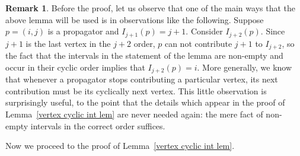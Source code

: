 \documentclass[11pt]{article}
\theoremstyle{remark}
\theoremstyle{definition}
\newtheorem{rmk}[thm]{Remark}
\begin{document}
\begin{rmk}\label{rmk cyclic}
  Before the proof, let us observe that one of the main ways that the above lemma will be used is in observations like the following.  Suppose $p=(i,j)$ is a propagator and $I_{j+1}(p) = j+1$.  Consider $I_{j+2}(p)$.  Since $j+1$ is the last vertex in the $j+2$ order, $p$ can not contribute $j+1$ to $I_{j+2}$, so the fact that the intervals in the statement of the lemma are non-empty and occur in their cyclic order implies that $I_{j+2}(p)=i$.  More generally, we know that whenever a propagator stops contributing a particular vertex, its next contribution must be its cyclically next vertex.  This little observation is surprisingly useful, to the point that the details which appear in the proof of Lemma~\ref{vertex cyclic int lem} are never needed again: the mere fact of non-empty intervals in the correct order suffices.
\end{rmk}
  
Now we proceed to the proof of Lemma~\ref{vertex cyclic int lem}.
\end{document}
